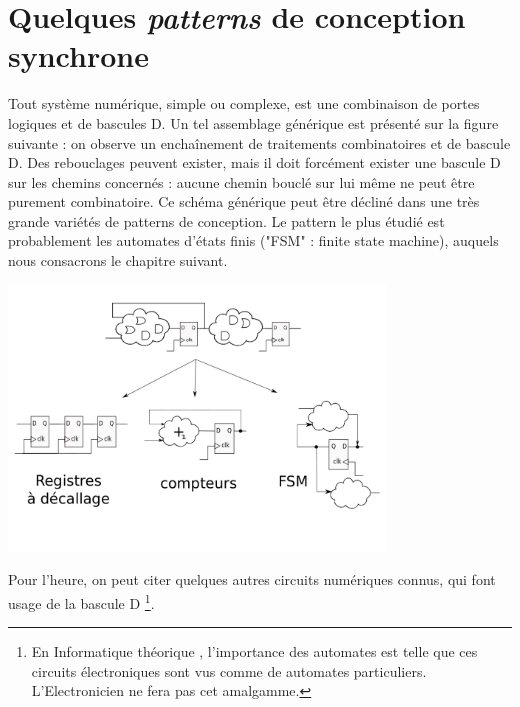 \section{Quelques {\it patterns} de conception synchrone}

Tout système numérique, simple ou complexe, est une combinaison de portes logiques et de bascules D.
Un tel assemblage générique est présenté sur la figure suivante : on observe un enchaînement de traitements
combinatoires et de bascule D. Des rebouclages peuvent exister, mais il doit forcément exister une bascule D sur les chemins
concernés : aucune chemin bouclé sur lui même ne peut être purement combinatoire. Ce schéma générique peut être décliné dans une
très grande variétés de patterns de conception. Le pattern le plus étudié est probablement les automates d'états finis ("FSM" : finite state machine), auquels
nous consacrons le chapitre suivant.

\begin{center}
  \includegraphics[width=10cm]{./figures/synchrone.png}
\end{center}

Pour l'heure, on peut citer quelques autres circuits numériques connus, qui font usage de la bascule D \footnote{En Informatique théorique , l'importance des automates est telle
que ces circuits électroniques sont vus comme de automates particuliers. L'Electronicien ne fera pas cet amalgamme.}.

